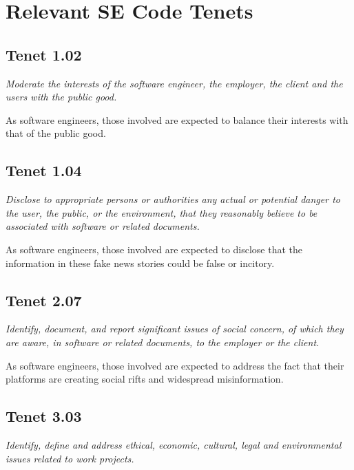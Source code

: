 
\section{Relevant SE Code Tenets}

\subsection{Tenet 1.02}

\emph{Moderate the interests of the software engineer, the employer, the client and the users with the public good. \cite{se_code}}

As software engineers, those involved are expected to balance their interests with that of the public good.

\subsection{Tenet 1.04}

\emph{Disclose to appropriate persons or authorities any actual or potential danger to the user, the public, or the environment, that they reasonably believe to be associated with software or related documents. \cite{se_code}}

As software engineers, those involved are expected to disclose that the information in these fake news stories could be false or incitory.

\subsection{Tenet 2.07}

\emph{Identify, document, and report significant issues of social concern, of which they are aware, in software or related documents, to the employer or the client. \cite{se_code}}

As software engineers, those involved are expected to address the fact that their platforms are creating social rifts and widespread misinformation.

\subsection{Tenet 3.03}

\emph{Identify, define and address ethical, economic, cultural, legal and environmental issues related to work projects. \cite{se_code}}

